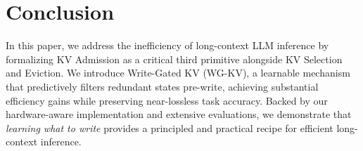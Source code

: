 \section{Conclusion}

In this paper, we address the inefficiency of long-context LLM inference by formalizing KV Admission as a critical third primitive alongside KV Selection and Eviction. We introduce Write-Gated KV (WG-KV), a learnable mechanism that predictively filters redundant states pre-write, achieving substantial efficiency gains while preserving near-lossless task accuracy. Backed by our hardware-aware implementation and extensive evaluations, we demonstrate that \textit{learning what to write} provides a principled and practical recipe for efficient long-context inference.